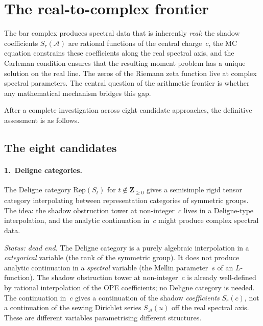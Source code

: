 \documentclass[11pt]{article}
\newcommand{\cA}{\mathcal{A}}
\begin{document}
\section{The real-to-complex frontier}
\label{sec:real-to-complex-frontier}

The bar complex produces spectral data that is inherently
\emph{real}: the shadow coefficients $S_r(\cA)$ are rational
functions of the central charge~$c$, the MC equation constrains
these coefficients along the real spectral axis, and the
Carleman condition ensures that the resulting moment problem has
a unique solution on the real line.  The zeros of the Riemann
zeta function live at complex spectral parameters.  The central
question of the arithmetic frontier is whether any mathematical
mechanism bridges this gap.

After a complete investigation across eight candidate
approaches, the definitive assessment is as follows.

\subsection{The eight candidates}

\paragraph{1.~Deligne categories.}
The Deligne category $\underline{\mathrm{Rep}}(S_t)$ for
$t \notin \mathbf{Z}_{\ge 0}$ gives a semisimple rigid tensor
category interpolating between representation categories of
symmetric groups.  The idea: the shadow obstruction tower at
non-integer~$c$ lives in a Deligne-type interpolation, and the
analytic continuation in~$c$ might produce complex spectral data.

\emph{Status: dead end.}  The Deligne category is a purely
algebraic interpolation in a \emph{categorical} variable
(the rank of the symmetric group).  It does not produce
analytic continuation in a \emph{spectral} variable (the
Mellin parameter~$s$ of an $L$-function).  The shadow obstruction tower
at non-integer~$c$ is already well-defined by rational
interpolation of the OPE coefficients; no Deligne category is
needed.  The continuation in~$c$ gives a continuation of the
shadow \emph{coefficients} $S_r(c)$, not a continuation of the
sewing Dirichlet series $S_\cA(u)$ off the real spectral axis.
These are different variables parametrising different structures.
\end{document}
